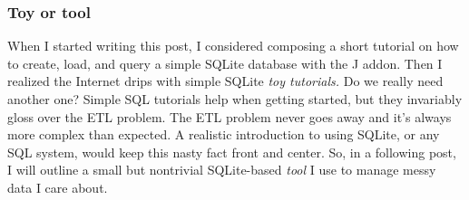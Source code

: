 \subsubsection{Toy or tool}%

When I started writing this post, I considered composing a short
tutorial on how to create, load, and query a simple SQLite database with
the J addon. Then I realized the Internet drips with simple SQLite
\emph{toy tutorials.} Do we really need another one? Simple SQL
tutorials help when getting started, but they invariably gloss over the
ETL problem. The ETL problem never goes away and it's always more
complex than expected. A realistic introduction to using SQLite, or any
SQL system, would keep this nasty fact front and center. So, in a following
post, I will outline a small but nontrivial SQLite-based \emph{tool} I
use to manage messy data I care about.


%
 

